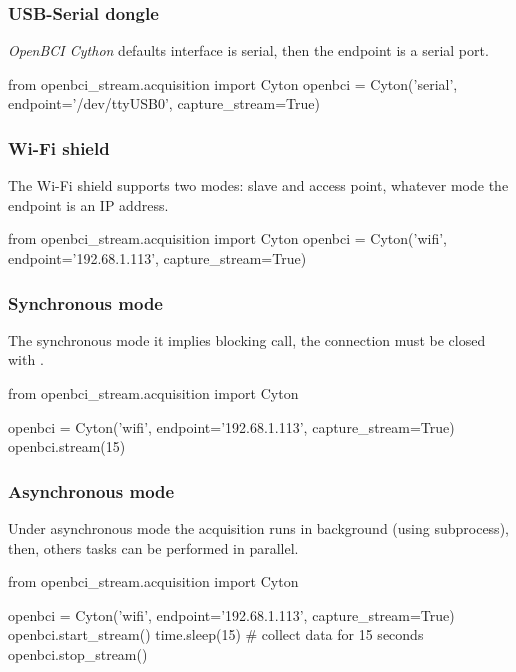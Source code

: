 \subsubsection{USB-Serial dongle}

\textit{OpenBCI Cython} defaults interface is serial, then the endpoint is a serial port.
\begin{python}
from openbci_stream.acquisition import Cyton
openbci = Cyton('serial', endpoint='/dev/ttyUSB0', capture_stream=True)
\end{python}

\subsubsection{Wi-Fi shield}

The Wi-Fi shield supports two modes: slave and access point, whatever mode the endpoint is an IP address.
\begin{python}
from openbci_stream.acquisition import Cyton
openbci = Cyton('wifi', endpoint='192.68.1.113', capture_stream=True)
\end{python}

\subsubsection{Synchronous mode}

The synchronous mode it implies blocking call, the connection must be closed with .
\begin{python}
from openbci_stream.acquisition import Cyton

openbci = Cyton('wifi', endpoint='192.68.1.113', capture_stream=True)
openbci.stream(15)
\end{python}

\subsubsection{Asynchronous mode}

Under asynchronous mode the acquisition runs in background (using subprocess), then, others tasks can be performed in parallel.
\begin{python}
from openbci_stream.acquisition import Cyton

openbci = Cyton('wifi', endpoint='192.68.1.113', capture_stream=True)
openbci.start_stream()
time.sleep(15)  # collect data for 15 seconds
openbci.stop_stream()
\end{python}

